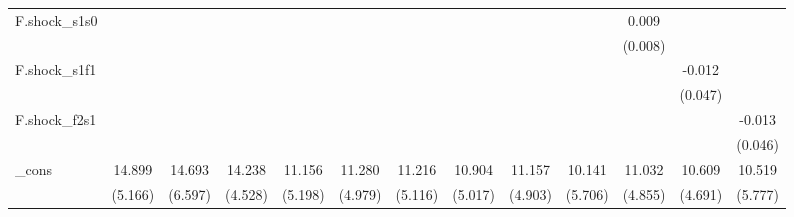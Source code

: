 {\begin{tabular}{l*{12}{c}}
\addlinespace
F.shock\_s1s0&                     &                     &                     &                     &                     &                     &                     &                     &                     &       0.009         &                     &                     \\
            &                     &                     &                     &                     &                     &                     &                     &                     &                     &     (0.008)         &                     &                     \\
\addlinespace
F.shock\_s1f1&                     &                     &                     &                     &                     &                     &                     &                     &                     &                     &      -0.012         &                     \\
            &                     &                     &                     &                     &                     &                     &                     &                     &                     &                     &     (0.047)         &                     \\
\addlinespace
F.shock\_f2s1&                     &                     &                     &                     &                     &                     &                     &                     &                     &                     &                     &      -0.013         \\
            &                     &                     &                     &                     &                     &                     &                     &                     &                     &                     &                     &     (0.046)         \\
\addlinespace
\_cons      &      14.899\sym{***}&      14.693\sym{**} &      14.238\sym{***}&      11.156\sym{**} &      11.280\sym{**} &      11.216\sym{**} &      10.904\sym{**} &      11.157\sym{**} &      10.141\sym{*}  &      11.032\sym{**} &      10.609\sym{**} &      10.519\sym{*}  \\
            &     (5.166)         &     (6.597)         &     (4.528)         &     (5.198)         &     (4.979)         &     (5.116)         &     (5.017)         &     (4.903)         &     (5.706)         &     (4.855)         &     (4.691)         &     (5.777)         \\

\end{tabular}}
